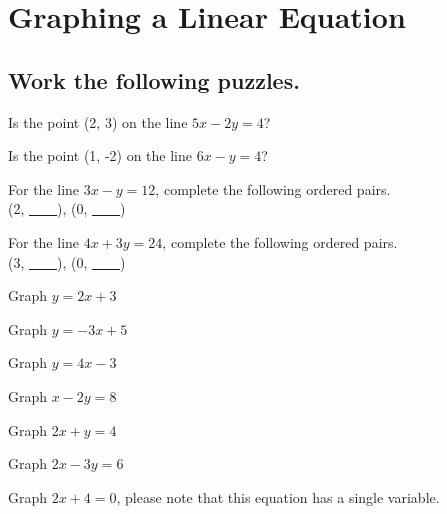 \section{Graphing a Linear Equation}

\subsection*{Work the following puzzles.}

\begin{puzzle}
    Is the point (2, 3) on the line \(5x - 2y = 4\)?
\end{puzzle}

\begin{puzzle}
    Is the point (1, -2) on the line \(6x - y = 4\)?
\end{puzzle}

\begin{puzzle}
    For the line \(3x - y = 12\), complete the following ordered pairs.\\
    (2, \underline{~~~~}), (0, \underline{~~~~})
\end{puzzle}

\begin{puzzle}
    For the line \(4x + 3y = 24\), complete the following ordered pairs.\\
    (3, \underline{~~~~}), (0, \underline{~~~~})
\end{puzzle}

\begin{puzzle}
    Graph \(y = 2x + 3\)
\end{puzzle}

\begin{puzzle}
    Graph \(y = -3x + 5\)
\end{puzzle}

\begin{puzzle}
    Graph \(y = 4x - 3\)
\end{puzzle}

\begin{puzzle}
    Graph \(x - 2y = 8\)
\end{puzzle}

\begin{puzzle}
    Graph \(2x + y = 4\)
\end{puzzle}

\begin{puzzle}
    Graph \(2x - 3y = 6\)
\end{puzzle}

\begin{puzzle}
    Graph \(2x + 4 = 0\), please note that this equation has a single variable.
\end{puzzle}

